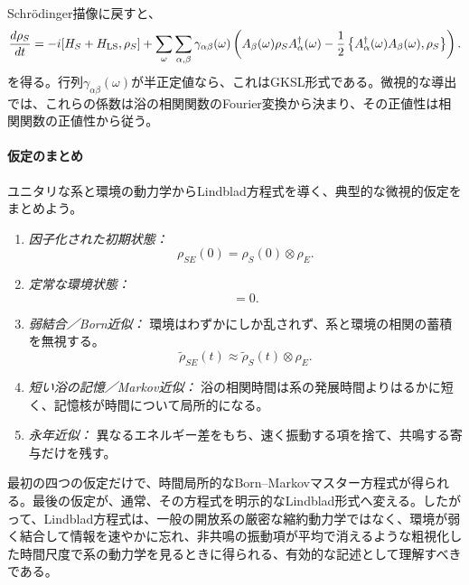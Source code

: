 \documentclass[a4paper,11pt,oneside]{article}
\theoremstyle{definition}
\numberwithin{equation}{section}
\begin{document}
Schr\"odinger描像に戻すと、
\begin{equation}\label{microscopic-Lindblad}
\frac{d\rho_S}{dt}
=
-i[H_S+H_{\rm LS},\rho_S]
+
\sum_{\omega}\sum_{\alpha,\beta}
\gamma_{\alpha\beta}(\omega)
\left(
A_\beta(\omega)\rho_S A_\alpha^\dagger(\omega)
-\frac12
\left\{
A_\alpha^\dagger(\omega)A_\beta(\omega),\rho_S
\right\}
\right) .
\end{equation}
を得る。行列$\gamma_{\alpha\beta}(\omega)$が半正定値なら、これはGKSL形式である。微視的な導出では、これらの係数は浴の相関関数のFourier変換から決まり、その正値性は相関関数の正値性から従う。



\paragraph{仮定のまとめ}



ユニタリな系と環境の動力学からLindblad方程式を導く、典型的な微視的仮定をまとめよう。



\begin{enumerate}
\item \textit{因子化された初期状態：}
\begin{equation}
\rho_{SE}(0)=\rho_S(0)\otimes \rho_E .
\end{equation}


\item \textit{定常な環境状態：}
\begin{equation}
[H_E,\rho_E]=0 .
\end{equation}


\item \textit{弱結合／Born近似：} 環境はわずかにしか乱されず、系と環境の相関の蓄積を無視する。
\begin{equation}
\tilde \rho_{SE}(t)\approx \tilde \rho_S(t)\otimes \rho_E .
\end{equation}


\item \textit{短い浴の記憶／Markov近似：} 浴の相関時間は系の発展時間よりはるかに短く、記憶核が時間について局所的になる。



\item \textit{永年近似：} 異なるエネルギー差をもち、速く振動する項を捨て、共鳴する寄与だけを残す。
\end{enumerate}



最初の四つの仮定だけで、時間局所的なBorn--Markovマスター方程式が得られる。最後の仮定が、通常、その方程式を明示的なLindblad形式へ変える。したがって、Lindblad方程式は、一般の開放系の厳密な縮約動力学ではなく、環境が弱く結合して情報を速やかに忘れ、非共鳴の振動項が平均で消えるような粗視化した時間尺度で系の動力学を見るときに得られる、有効的な記述として理解すべきである。
\end{document}
